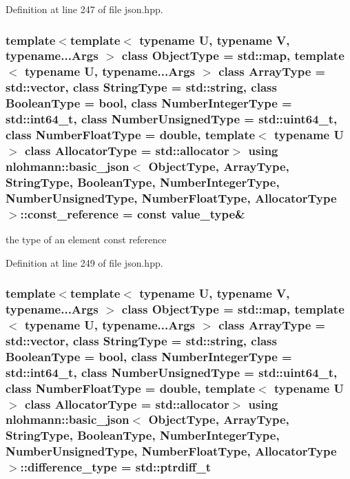 Definition at line 247 of file json.\+hpp.

\hypertarget{classnlohmann_1_1basic__json_af677a29b0e66edc9f66e5167e4667071}{}
\subsubsection[{const\+\_\+reference}]{\setlength{\rightskip}{0pt plus 5cm}template$<$template$<$ typename U, typename V, typename...\+Args $>$ class Object\+Type = std\+::map, template$<$ typename U, typename...\+Args $>$ class Array\+Type = std\+::vector, class String\+Type  = std\+::string, class Boolean\+Type  = bool, class Number\+Integer\+Type  = std\+::int64\+\_\+t, class Number\+Unsigned\+Type  = std\+::uint64\+\_\+t, class Number\+Float\+Type  = double, template$<$ typename U $>$ class Allocator\+Type = std\+::allocator$>$ using {\bf nlohmann\+::basic\+\_\+json}$<$ Object\+Type, Array\+Type, String\+Type, Boolean\+Type, Number\+Integer\+Type, Number\+Unsigned\+Type, Number\+Float\+Type, Allocator\+Type $>$\+::{\bf const\+\_\+reference} =  const {\bf value\+\_\+type}\&}\label{classnlohmann_1_1basic__json_af677a29b0e66edc9f66e5167e4667071}


the type of an element const reference 



Definition at line 249 of file json.\+hpp.

\hypertarget{classnlohmann_1_1basic__json_aec316934a555dd1acdd3600e5d4a4cdf}{}
\subsubsection[{difference\+\_\+type}]{\setlength{\rightskip}{0pt plus 5cm}template$<$template$<$ typename U, typename V, typename...\+Args $>$ class Object\+Type = std\+::map, template$<$ typename U, typename...\+Args $>$ class Array\+Type = std\+::vector, class String\+Type  = std\+::string, class Boolean\+Type  = bool, class Number\+Integer\+Type  = std\+::int64\+\_\+t, class Number\+Unsigned\+Type  = std\+::uint64\+\_\+t, class Number\+Float\+Type  = double, template$<$ typename U $>$ class Allocator\+Type = std\+::allocator$>$ using {\bf nlohmann\+::basic\+\_\+json}$<$ Object\+Type, Array\+Type, String\+Type, Boolean\+Type, Number\+Integer\+Type, Number\+Unsigned\+Type, Number\+Float\+Type, Allocator\+Type $>$\+::{\bf difference\+\_\+type} =  std\+::ptrdiff\+\_\+t}\label{classnlohmann_1_1basic__json_aec316934a555dd1acdd3600e5d4a4cdf}


